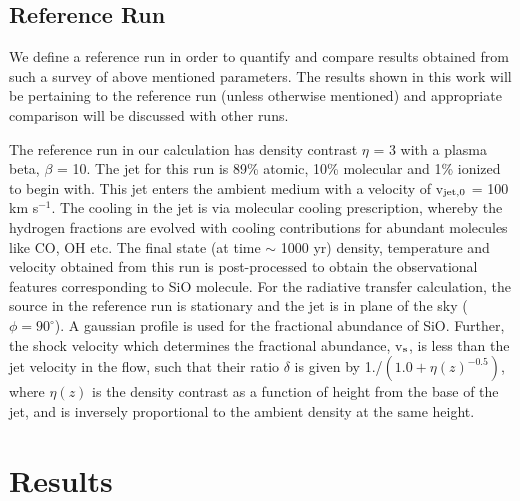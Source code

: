 \documentclass[useAMS,usenatbib]{mn2e}
\begin{document}
\subsection{Reference Run}
\label{ssec:refrun}
We define a reference run in order to quantify and compare results obtained from such a
survey of above mentioned parameters. The results shown in this work will be
pertaining to the reference run (unless otherwise mentioned) and appropriate comparison will be
discussed with other runs.
%

The reference run in our calculation has density contrast $\eta$ = 3
with a plasma beta, $\beta$ = 10. The jet for this run is 89\% atomic,
10\% molecular and 1\% ionized to begin with. This jet enters the
ambient medium with a velocity of v$_{\rm jet,0}$ = 100 km
s$^{-1}$. The cooling in the jet is
via molecular cooling prescription, whereby the hydrogen fractions are
evolved with cooling contributions for abundant molecules like CO, OH
etc. The final state (at time $\sim$ 1000 yr) density, temperature and velocity obtained from this 
run is post-processed to obtain the observational features
corresponding to SiO molecule. 
For the radiative transfer calculation, the source in the reference
run is stationary and the jet is in plane of the sky ($\phi =
90^{\circ}$). A gaussian profile is used for the fractional abundance
of SiO.
Further, the shock velocity which determines
the fractional abundance, v$_{\rm s}$, is less than the jet velocity in the
flow, such that their ratio $\delta$ is given by 1./$(1.0 +
\eta(z)^{-0.5})$, where $\eta(z)$ is the density contrast as a
function of height from the base of the jet, and is inversely proportional to the ambient density at the same height.

\section{Results}
\label{sec:results}
\end{document}

